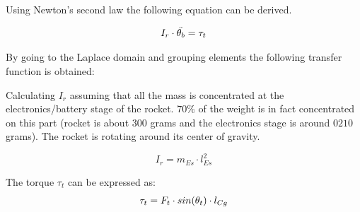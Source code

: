		
		Using Newton's second law the following equation can be derived.

		\begin{equation}
			I_r \cdot \ddot{\theta_b}=\tau_t \addunit{\newton$\cdot$\meter} \label{eq:rocket_angle_1}
		\end{equation}
		\startexplain
		\stopexplain
		
%		
		
		By going to the Laplace domain and grouping elements the following transfer function is obtained:
%		
		
		Calculating $I_r$ assuming that all the mass is concentrated at the electronics/battery stage of the rocket. $70\%$ of the weight is in fact concentrated on this part (rocket is about $300$ grams and the electronics stage is around $0210$ grams). The rocket is rotating around its center of gravity.
		
		\begin{equation}
		I_r=m_{Es} \cdot l_{Es}^2 \label{eq:rocket_angle_3}
		\end{equation}
		\startexplain
		\stopexplain
		
		The torque $\tau_t$ can be expressed as:
		\begin{equation}
		\tau_t = F_t \cdot sin(\theta_t) \cdot l_{Cg} \addunit{\newton$\cdot$\meter} \label{eq:tau_t}
		\end{equation}
		\startexplain
		\stopexplain
		

